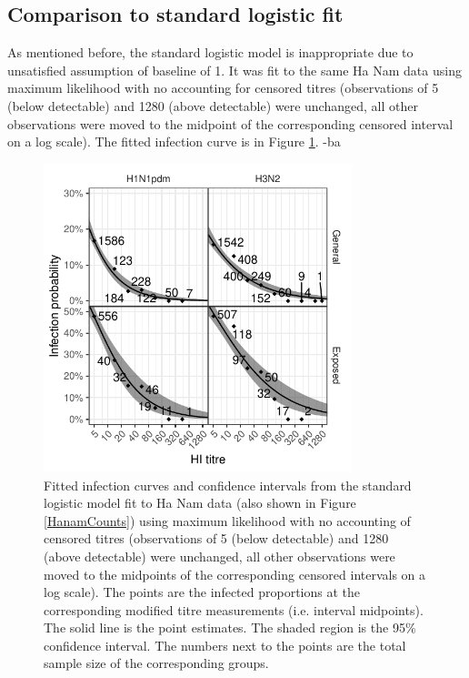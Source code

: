 \documentclass[12pt]{article}
\begin{document}
\subsection{Comparison to standard logistic fit}

As mentioned before, the standard logistic model is inappropriate due to unsatisfied assumption of baseline of 1. It was fit to the same Ha Nam data using maximum likelihood with no accounting for censored titres (observations of 5 (below detectable) and 1280 (above detectable) were unchanged, all other observations were moved to the midpoint of the corresponding censored interval on a log scale). The fitted infection curve is in Figure \ref{lr-inf}.
-ba
\begin{figure}[htp]
	\centering
	\includegraphics[width=0.8\textwidth]{../fit-logistic-plot/hanam-hi-inf.pdf}
	\caption{
	Fitted infection curves and confidence intervals from the standard logistic model fit to Ha Nam data (also shown in Figure \ref{HanamCounts}) using maximum likelihood with no accounting of censored titres (observations of 5 (below detectable) and 1280 (above detectable) were unchanged, all other observations were moved to the midpoints of the corresponding censored intervals on a log scale). The points are the infected proportions at the corresponding modified titre measurements (i.e. interval midpoints). The solid line is the point estimates. The shaded region is the 95\% confidence interval. The numbers next to the points are the total sample size of the corresponding groups.
	}
	\label{lr-inf}
\end{figure}
\end{document}
